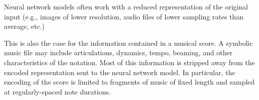 
Neural network models often work with a reduced
representation of the original input (e.g., images of lower
resolution, audio files of lower sampling rates than
average, etc.)

This is also the case for the information contained in a
musical score. A symbolic music file may include
articulations, dynamics, tempo, beaming, and other
characteristics of the notation. Most of this information is
stripped away from the encoded representation sent to the
neural network model. In particular, the encoding of the
score is limited to fragments of music of fixed length and sampled at regularly-spaced note durations.
